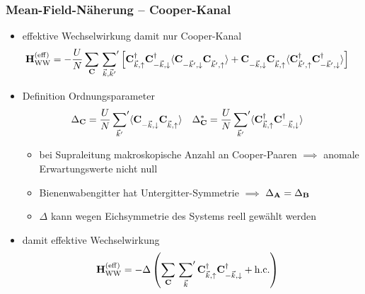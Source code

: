 \begin{frame}
    \frametitle{Mean-Field-Näherung -- Cooper-Kanal}
    \begin{itemize}
        \item effektive Wechselwirkung damit nur Cooper-Kanal
        \begin{align*}
            \oHWWeff &= -\frac{U}{N} \sum_\oC \sump{\vk, \vk'}\left[\ocd{\vk, \up} \ocd{-\vk, \down} \expval{\oc{-\vk', \down} \oc{\vk', \up}} + \ocndd \ocndu \expval{\ocdu \ocdd}\right]
        \end{align*}
        \pause
        \item Definition Ordnungsparameter
        \begin{align*}
            \Delta_\oC &= \frac{U}{N} \sump{\vec{k}'} \expval{\oc{-\vk, \down} \ocndu} &\Delta_{\oC}^{*} &= \frac{U}{N} \sump{\vec{k}'} \expval{\ocdup \ocddown}
        \end{align*}
        \pause
        \begin{itemize}
            \item[$\rightarrow$] bei Supraleitung makroskopische Anzahl an Cooper-Paaren $\implies$ anomale Erwartungswerte nicht null 
            \item[$\rightarrow$] Bienenwabengitter hat Untergitter-Symmetrie $\implies$ $\Delta_\mathbf{A} = \Delta_\mathbf{B}$
            \item[$\rightarrow$] $\Delta$ kann wegen Eichsymmetrie des Systems reell gewählt werden
        \end{itemize}
        \pause
        \item damit effektive Wechselwirkung
        \begin{align*}
            \mathbf{H}_{\mathrm{WW}}^{(\mathrm{eff})} &= - \Delta \left(\sum_\mathbf{C} \sideset{}{'}\sum_{{\vec{k}}} \mathbf{C}^{\dagger}_{{\vec{k}}, \uparrow} \mathbf{C}^{\dagger}_{-{\vec{k}}, \downarrow} + \text{h.c.}\right)
        \end{align*}
    \end{itemize}
\end{frame}

